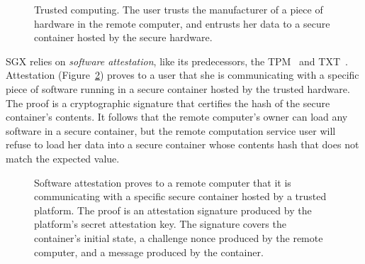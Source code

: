 \begin{figure}[hbt]
  \caption{
    Trusted computing. The user trusts the manufacturer of a piece of hardware
    in the remote computer, and entrusts her data to a secure container hosted
    by the secure hardware.
  }
  \label{fig:trusted_computing}
\end{figure}

SGX relies on \textit{software attestation}, like its predecessors, the
TPM~\cite{grawrock2003tpm} and TXT~\cite{grawrock2009txt}. Attestation
(Figure~\ref{fig:generic_attestation}) proves to a user that she is
communicating with a specific piece of software running in a secure container
hosted by the trusted hardware. The proof is a cryptographic signature that
certifies the hash of the secure container's contents. It follows that the
remote computer's owner can load any software in a secure container, but the
remote computation service user will refuse to load her data into a secure
container whose contents hash that does not match the expected value.

\begin{figure}[hbt]
  \caption{
    Software attestation proves to a remote computer that it is communicating
    with a specific secure container hosted by a trusted platform. The proof is
    an attestation signature produced by the platform's secret attestation key.
    The signature covers the container's initial state, a challenge nonce
    produced by the remote computer, and a message produced by the container.
  }
  \label{fig:generic_attestation}
\end{figure}

